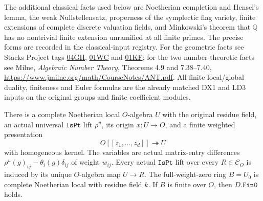 The additional classical facts used below are Noetherian
completion and Hensel's lemma, the weak Nullstellensatz,
properness of the symplectic flag variety, finite extensions
of complete discrete valuation fields, and Minkowski's theorem
that $\mathbb Q$ has no nontrivial finite extension unramified
at all finite primes.  The precise forms are recorded in the
classical-input registry.  For the geometric facts see Stacks
Project tags \href{https://stacks.math.columbia.edu/tag/04GH}{04GH},
\href{https://stacks.math.columbia.edu/tag/01WC}{01WC} and
\href{https://stacks.math.columbia.edu/tag/01KF}{01KF};
for the two number-theoretic facts see Milne,
\emph{Algebraic Number Theory}, Theorems 4.9 and 7.38--7.40,
\url{https://www.jmilne.org/math/CourseNotes/ANT.pdf}.
All finite local/global duality, finiteness and Euler formulas
are the already matched DX1 and LD3 inputs on the original
groups and finite coefficient modules.

\begin{proposition}
\label{claim:IX1}
There is a complete Noetherian local $O$-algebra $U$ with the
original residue field, an actual universal $\texttt{IsPt}$ lift
$\rho^u$, its origin $x:U\to O$, and a finite weighted
presentation
\[
       O[[z_1,\ldots,z_d]]\twoheadrightarrow U
 \tag{IX.3}
\]
with homogeneous kernel.  The variables are actual matrix-entry
differences $\rho^u(g)_{ij}-\theta_i(g)\delta_{ij}$ of weight
$w_{ij}$.  Every actual $\texttt{IsPt}$ lift over every
$R\in\mathcal C_O$ is induced by its unique $O$-algebra map
$U\to R$.
The full-weight-zero ring $B=U_0$ is complete Noetherian local
with residue field $k$.  If $B$ is finite over $O$, then
$D.\texttt{Fin0}$ holds.
\end{proposition}

